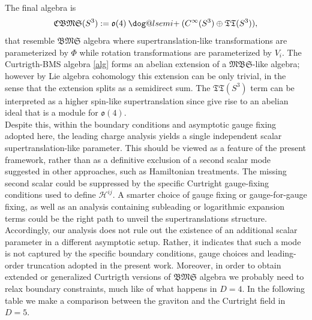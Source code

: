 \documentclass[a4paper,12pt]{article}
\makeatletter
\DeclareRobustCommand{\loplus}{\mathbin{\mathpalette\dog@lsemi{+}}}
\newcommand{\dog@lsemi}[2]{\dog@semi{#1}{#2}{270,90}}
\newcommand{\dog@semi}[3]{%
  \begingroup
  \sbox\z@{$\m@th#1#2$}%
  \setlength{\unitlength}{\dimexpr\ht\z@+\dp\z@\relax}%
  \makebox[\wd\z@]{\raisebox{-\dp\z@}{%
    \begin{picture}(1,1)
    \linethickness{\variable@rule{#1}}
    \roundcap
    \put(0.5,0.5){\makebox(0,0){\raisebox{\dp\z@}{$\m@th#1#2$}}}
    \put(0.5,0.5){\arc[#3]{0.5}}
    \end{picture}%
  }}%
  \endgroup
}
\newcommand{\variable@rule}[1]{%
  \fontdimen8  
  \ifx#1\displaystyle\textfont3\else
    \ifx#1\textstyle\textfont3\else
      \ifx#1\scriptstyle\scriptfont3\else
        \scriptscriptfont3\relax
  \fi\fi\fi
}
\makeatother
\begin{document}
The final algebra is 
\begin{equation}
    \mathfrak{CBMS}(S^3):=\mathfrak{o}(4) \loplus (C^{\infty}(S^3)\oplus \mathfrak{TT}(S^3)),
    \label{alg}
\end{equation}
that resemble $\mathfrak{BMS}$ algebra where supertranslation-like transformations are parameterized by $\Phi$ while rotation transformations are parameterized by $V_i$. The Curtrigth-BMS algebra \eqref{alg} forms an abelian extension of a $\mathfrak{MBS}$-like algebra; however by Lie algebra cohomology this extension can be only trivial, in the sense that the extension splits as a semidirect sum. The $\mathfrak{TT}(S^3)$ term can be interpreted as a higher spin-like supertranslation since give rise to an abelian ideal that is a module for $\mathfrak{o}(4)$.\\
Despite this, within the boundary conditions and asymptotic gauge fixing adopted here, the leading charge analysis yields a single independent scalar supertranslation-like parameter. This should be viewed as a feature of the present framework, rather than as a definitive exclusion of a second scalar mode suggested in other approaches, such as Hamiltonian treatments. The missing second scalar could be suppressed by the specific Curtright gauge-fixing conditions used to define $\mathcal{H}^{ij}$. A smarter choice of gauge fixing or gauge-for-gauge fixing, as well as an analysis containing subleading or logarithmic expansion terms could be the right path to unveil the supertranslations structure. Accordingly, our analysis does not rule out the existence of an additional scalar parameter in a different asymptotic setup. Rather, it indicates that such a mode is not captured by the specific boundary conditions, gauge choices and leading-order truncation adopted in the present work. Moreover, in order to obtain extended or generalized Curtrigth versions of $\mathfrak{BMS}$ algebra we probably need to relax boundary constraints, much like of what happens in $D=4$. In the following table we make a comparison between the graviton and the Curtright field in $D=5$.

\renewcommand{\arraystretch}{1.25}
\end{document}
